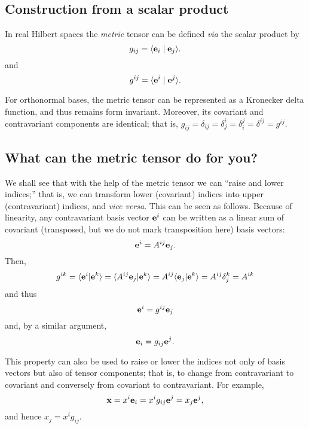 \subsection{Construction from a scalar product}

In real Hilbert spaces the {\em metric} tensor can be defined {\it via}  the scalar product  by
\begin{equation}
g_{ij}= \langle {\bf e}_i \mid {\bf e}_j\rangle .
\label{2016-m-ch-tensor-gij}
\end{equation}
and
\begin{equation}
g^{ij}= \langle {\bf e}^i \mid {\bf e}^j\rangle .
\label{2016-m-ch-tensor-gij2}
\end{equation}




For orthonormal bases, the metric tensor can be
represented as a Kronecker delta function, and thus remains form invariant.
Moreover, its covariant and contravariant components are identical; that is,
$g_{ij}=\delta_{ij}=\delta^i_j=\delta_i^j=\delta^{ij}=g^{ij}$.


\subsection{What can the metric tensor do for you?}

We shall see that with the help of the metric tensor we can ``raise and lower indices;''
that is, we can transform lower (covariant) indices into upper (contravariant) indices, and {\it vice versa}.
This can be seen as follows.
Because of linearity, any contravariant basis vector ${\bf e}^i$
can be written as a linear sum of covariant (transposed, but we do not mark transposition here) basis vectors:
\begin{equation}
{\bf e}^i=A^{ij}{\bf e}_j.
\end{equation}
Then,
\begin{equation}
g^{ik} = \langle {\bf e}^i \vert {\bf e}^k \rangle  =\langle A^{ij}{\bf e}_j\vert  {\bf e}^k  \rangle
=A^{ij}\langle {\bf e}_j \vert  {\bf e}^k\rangle =A^{ij}\delta_j^k=A^{ik}
\end{equation}
and thus
\begin{equation}
{\bf e}^i=g^{ij}{\bf e}_j
\end{equation}
and, by a similar argument,
\begin{equation}
{\bf e}_i=g_{ij}{\bf e}^j.
\end{equation}


This property can also be used to raise or lower the indices not only of basis vectors but also of tensor components; that is,
to change from contravariant to covariant and conversely from covariant
to contravariant.
For example,
\begin{equation}
{\bf x} =
x^i {\bf e}_i = x^i g_{ij} {\bf e}^j   = x_j {\bf e}^j,
\end{equation}
and hence $x_j = x^i g_{ij}$.

